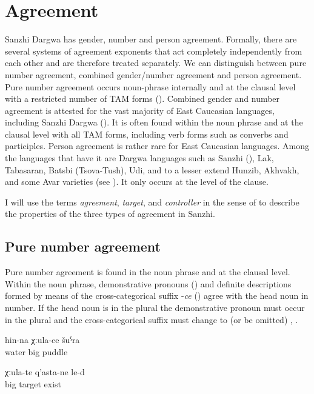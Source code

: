 \chapter{Agreement}
\label{cpt:Agreement}

Sanzhi Dargwa has gender, number and person agreement. Formally, there are several systems of agreement exponents that act completely independently from each other and are therefore treated separately. We can distinguish between pure number agreement, combined gender/number agreement and person agreement. Pure number agreement occurs noun-phrase internally and at the clausal level with a restricted number of TAM forms (). Combined gender and number agreement is attested for the vast majority of East Caucasian languages, including Sanzhi Dargwa (). It is often found within the noun phrase and at the clausal level with all TAM forms, including verb forms such as converbs and participles. Person agreement is rather rare for East Caucasian languages. Among the languages that have it are Dargwa languages such as Sanzhi (), Lak, Tabasaran, Batsbi (Tsova-Tush), Udi, and to a lesser extend Hunzib, Akhvakh, and some Avar varieties (see \citealp{Helmbrecht1996, vandenBerg1999, Schulze2007}). It only occurs at the level of the clause.

I will use the terms \textit{agreement}, \textit{target}, and \textit{controller} in the sense of \citealp{Corbett2006} to describe the properties of the three types of agreement in Sanzhi.



\section{Pure number agreement}
\label{sec:Pure number agreement}
Pure number agreement is found in the noun phrase and at the clausal level. Within the noun phrase, demonstrative pronouns () and definite descriptions formed by means of the cross-categorical suffix -\textit{ce} () agree with the head noun in number. If the head noun is in the plural the demonstrative pronoun must occur in the plural and the cross-categorical suffix must change to  (or be omitted)  , .
%
\begin{exe}
	\ex	\label{ex:‎a big puddle of water}
	\gll	hin-na	χːula-ce	šuˁra\\
		water	big	puddle\\
	\glt	{}

	\ex	\label{ex:‎There are big targets}
	\gll	χːula-te	q'asta-ne	le-d\\
		big 	target	exist\\
	\glt	{}
\end{exe}

